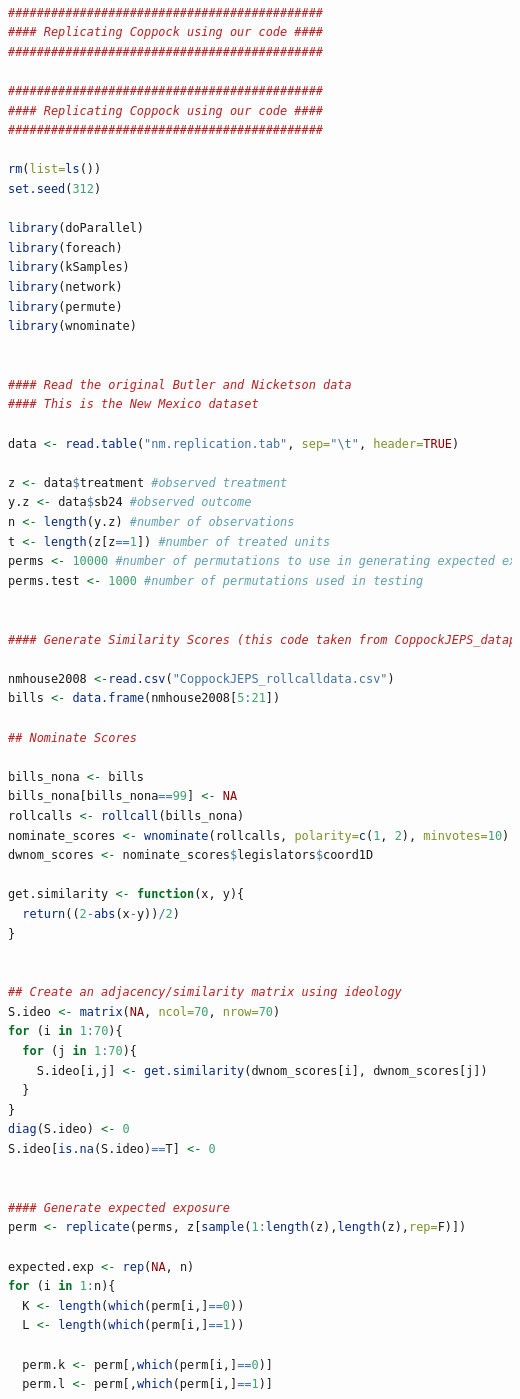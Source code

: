 \documentclass[12pt]{article}
\begin{document}
\begin{lstlisting}[language=R]

############################################
#### Replicating Coppock using our code ####
############################################

############################################
#### Replicating Coppock using our code ####
############################################

rm(list=ls())
set.seed(312)

library(doParallel)
library(foreach)
library(kSamples)
library(network)
library(permute)
library(wnominate)


#### Read the original Butler and Nicketson data
#### This is the New Mexico dataset

data <- read.table("nm.replication.tab", sep="\t", header=TRUE)

z <- data$treatment #observed treatment
y.z <- data$sb24 #observed outcome
n <- length(y.z) #number of observations
t <- length(z[z==1]) #number of treated units
perms <- 10000 #number of permutations to use in generating expected exposure
perms.test <- 1000 #number of permutations used in testing


#### Generate Similarity Scores (this code taken from CoppockJEPS_datapreparation.R)

nmhouse2008 <-read.csv("CoppockJEPS_rollcalldata.csv")
bills <- data.frame(nmhouse2008[5:21])

## Nominate Scores

bills_nona <- bills
bills_nona[bills_nona==99] <- NA
rollcalls <- rollcall(bills_nona)
nominate_scores <- wnominate(rollcalls, polarity=c(1, 2), minvotes=10)
dwnom_scores <- nominate_scores$legislators$coord1D

get.similarity <- function(x, y){
  return((2-abs(x-y))/2)
}


## Create an adjacency/similarity matrix using ideology
S.ideo <- matrix(NA, ncol=70, nrow=70)
for (i in 1:70){
  for (j in 1:70){
    S.ideo[i,j] <- get.similarity(dwnom_scores[i], dwnom_scores[j])
  }
}
diag(S.ideo) <- 0
S.ideo[is.na(S.ideo)==T] <- 0


#### Generate expected exposure
perm <- replicate(perms, z[sample(1:length(z),length(z),rep=F)])

expected.exp <- rep(NA, n)
for (i in 1:n){
  K <- length(which(perm[i,]==0))
  L <- length(which(perm[i,]==1))
  
  perm.k <- perm[,which(perm[i,]==0)]
  perm.l <- perm[,which(perm[i,]==1)]
  

\end{lstlisting}
\end{document}

